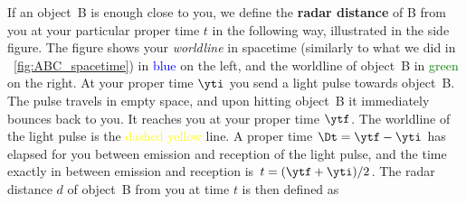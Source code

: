 %
%
If an object~B is enough close to you, we define the \textbf{radar distance} of B from you at your particular proper time $t$ in the following way, illustrated in the side figure. The figure shows your \emph{worldline} in spacetime (similarly to what we did in \fig~\ref{fig:ABC_spacetime}) in \textcolor{blue}{blue} on the left, and the worldline of object~B in \textcolor{green}{green} on the right. At your proper time $\yti$ you send a light pulse towards object~B. The pulse travels in empty space, and upon hitting object~B it immediately bounces back to you. It reaches you at your proper time $\ytf$. The worldline of the light pulse is the \textcolor{yellow}{dashed yellow} line. A proper time $\Dt = \ytf - \yti$ has elapsed for you between emission and reception of the light pulse, and the time exactly in between emission and reception is $t = (\ytf + \yti)/2$. The radar distance $d$ of object~B from you at time $t$ is then defined as
